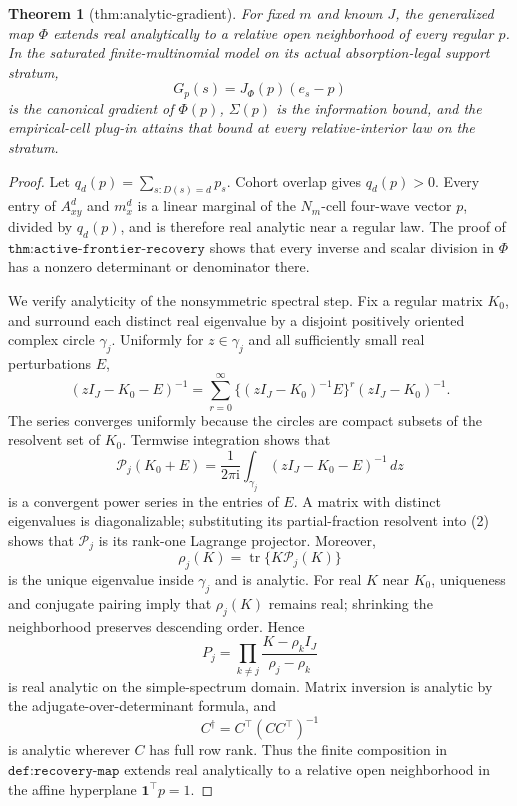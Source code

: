 \documentclass{article}
\newtheorem{theorem}{Theorem}
\begin{document}
\begin{theorem}[thm:analytic-gradient]\label{thm:analytic-gradient}
For fixed \(m\) and known \(J\), the generalized map \(\Phi\) extends real analytically to a relative open neighborhood of every regular \(p\). In the saturated finite-multinomial model on its actual absorption-legal support stratum,
\[
 G_p(s)=J_\Phi(p)(e_s-p)
\]
is the canonical gradient of \(\Phi(p)\), \(\Sigma(p)\) is the information bound, and the empirical-cell plug-in attains that bound at every relative-interior law on the stratum.
\end{theorem}
\begin{proof}
Let \(q_d(p)=\sum_{s:D(s)=d}p_s\).  Cohort overlap gives \(q_d(p)>0\).  Every entry of \(A_{xy}^d\) and \(m_x^d\) is a linear marginal of the \(N_m\)-cell four-wave vector \(p\), divided by \(q_d(p)\), and is therefore real analytic near a regular law.  The proof of \(\texttt{thm:active-frontier-recovery}\) shows that every inverse and scalar division in \(\Phi\) has a nonzero determinant or denominator there.

We verify analyticity of the nonsymmetric spectral step.  Fix a regular matrix \(K_0\), and surround each distinct real eigenvalue by a disjoint positively oriented complex circle \(\gamma_j\).  Uniformly for \(z\in\gamma_j\) and all sufficiently small real perturbations \(E\),
\[
 (zI_J-K_0-E)^{-1}
 =\sum_{r=0}^{\infty}\{(zI_J-K_0)^{-1}E\}^r(zI_J-K_0)^{-1}.
\tag{1}
\]
The series converges uniformly because the circles are compact subsets of the resolvent set of \(K_0\).  Termwise integration shows that
\[
 \mathcal P_j(K_0+E)=\frac{1}{2\pi\mathrm i}
 \int_{\gamma_j}(zI_J-K_0-E)^{-1}\,dz
\tag{2}
\]
is a convergent power series in the entries of \(E\).  A matrix with distinct eigenvalues is diagonalizable; substituting its partial-fraction resolvent into (2) shows that \(\mathcal P_j\) is its rank-one Lagrange projector.  Moreover,
\[
 \rho_j(K)=\operatorname{tr}\{K\mathcal P_j(K)\}
\tag{3}
\]
is the unique eigenvalue inside \(\gamma_j\) and is analytic.  For real \(K\) near \(K_0\), uniqueness and conjugate pairing imply that \(\rho_j(K)\) remains real; shrinking the neighborhood preserves descending order.  Hence
\[
 P_j=\prod_{k\ne j}\frac{K-\rho_kI_J}{\rho_j-\rho_k}
\tag{4}
\]
is real analytic on the simple-spectrum domain.  Matrix inversion is analytic by the adjugate-over-determinant formula, and
\[
 C^\dagger=C^\top(CC^\top)^{-1}
\tag{5}
\]
is analytic wherever \(C\) has full row rank.  Thus the finite composition in \(\texttt{def:recovery-map}\) extends real analytically to a relative open neighborhood in the affine hyperplane \(\mathbf1^\top p=1\).


\end{proof}
\end{document}
